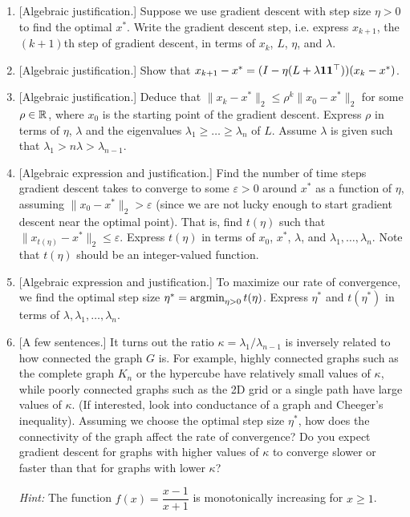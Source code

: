 \begin{enumerate}
    \sol{}
    \item {[Algebraic justification.]}
    Suppose we use gradient descent with step size $\eta>0$ to find the optimal $x^*$. Write the gradient descent step, i.e. express $x_{k+1}$, the $(k+1)$th step of gradient descent, in terms of $x_k$, $L$, $\eta$, and $\lambda$.
    
    \sol{}
    \item {[Algebraic justification.]}
    Show that $x_{k+1}-x^*=(I-\eta(L+\lambda\mathbf{1}\mathbf{1}^{\top}))(x_k-x^*)$.
    
    \sol{}
    \item {[Algebraic justification.]}
    Deduce that $\|x_k-x^*\|_2\leq \rho^k\|x_0-x^*\|_2$ for some $\rho\in\mathbb{R}^{}$, where $x_0$ is the starting point of the gradient descent. Express $\rho$ in terms of $\eta$, $\lambda$ and the eigenvalues $\lambda_1\geq\ldots\geq\lambda_n$ of $L$. Assume $\lambda$ is given such that $\lambda_1>n\lambda>\lambda_{n-1}$.
    
    \sol{}
    \item {[Algebraic expression and justification.]}
    Find the number of time steps gradient descent takes to converge to some $\varepsilon>0$ around $x^*$ as a function of $\eta$, assuming $\|x_0-x^*\|_2>\varepsilon$ (since we are not lucky enough to start gradient descent near the optimal point). That is, find $t(\eta)$ such that $\|x_{t(\eta)}-x^*\|_2\leq \varepsilon$. Express $t(\eta)$ in terms of $x_0$, $x^*$, $\lambda$, and $\lambda_1,\ldots,\lambda_n$. Note that $t(\eta)$ should be an integer-valued function.
    
    \sol{}
    \item {[Algebraic expression and justification.]}
    To maximize our rate of convergence, we find the optimal step size $\eta^*=\operatorname*{\arg\!\min}_{\eta>0}t(\eta)$. Express $\eta^*$ and $t(\eta^*)$ in terms of $\lambda,\lambda_1,\ldots,\lambda_n$.
    
    
    \sol{}
    \item {[A few sentences.]}
    It turns out the ratio $\kappa=\lambda_1/\lambda_{n-1}$ is inversely related to how connected the graph $G$ is. For example, highly connected graphs such as the complete graph $K_n$ or the hypercube have relatively small values of $\kappa$, while poorly connected graphs such as the 2D grid or a single path have large values of $\kappa$. (If interested, look into conductance of a graph and Cheeger's inequality). Assuming we choose the optimal step size $\eta^*$, how does the connectivity of the graph affect the rate of convergence? Do you expect gradient descent for graphs with higher values of $\kappa$ to converge slower or faster than that for graphs with lower $\kappa$?
   
    \textit{Hint:} The function $f(x)=\dfrac{x-1}{x+1}$ is monotonically increasing for $x\geq 1$.
    
    \sol{}
    
\end{enumerate}